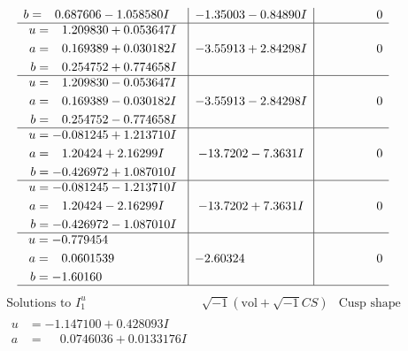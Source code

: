 \documentclass[1p]{elsarticle_modified}
\theoremstyle{definition}
\newcommand{\I}{\sqrt{-1}}
\begin{document}
$$\begin{array}{c|c|c}
\begin{aligned}
b &= \phantom{-}0.687606 - 1.058580 I\end{aligned}
 & -1.35003 - 0.84890 I & \phantom{-0.000000 } 0 \\ \hline\begin{aligned}
u &= \phantom{-}1.209830 + 0.053647 I \\
a &= \phantom{-}0.169389 + 0.030182 I \\
b &= \phantom{-}0.254752 + 0.774658 I\end{aligned}
 & -3.55913 + 2.84298 I & \phantom{-0.000000 } 0 \\ \hline\begin{aligned}
u &= \phantom{-}1.209830 - 0.053647 I \\
a &= \phantom{-}0.169389 - 0.030182 I \\
b &= \phantom{-}0.254752 - 0.774658 I\end{aligned}
 & -3.55913 - 2.84298 I & \phantom{-0.000000 } 0 \\ \hline\begin{aligned}
u &= -0.081245 + 1.213710 I \\
a &= \phantom{-}1.20424 + 2.16299 I \\
b &= -0.426972 + 1.087010 I\end{aligned}
 & -13.7202 - 7.3631 I & \phantom{-0.000000 } 0 \\ \hline\begin{aligned}
u &= -0.081245 - 1.213710 I \\
a &= \phantom{-}1.20424 - 2.16299 I \\
b &= -0.426972 - 1.087010 I\end{aligned}
 & -13.7202 + 7.3631 I & \phantom{-0.000000 } 0 \\ \hline\begin{aligned}
u &= -0.779454\phantom{ +0.000000I} \\
a &= \phantom{-}0.0601539\phantom{ +0.000000I} \\
b &= -1.60160\phantom{ +0.000000I}\end{aligned}
 & -2.60324\phantom{ +0.000000I} & \phantom{-0.000000 } 0\\
 \hline 
 \end{array}$$\newpage$$\begin{array}{c|c|c}  
\text{Solutions to }I^u_{1}& \I (\text{vol} + \sqrt{-1}CS) & \text{Cusp shape}\\
 \hline 
\begin{aligned}
u &= -1.147100 + 0.428093 I \\
a &= \phantom{-}0.0746036 + 0.0133176 I \\

\end{aligned}
\end{array}$$
\end{document}
